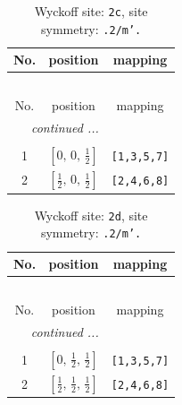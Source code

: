 \documentclass[fleqn,8pt]{jsarticle}
\begin{document}
\begin{longtable}{ccc}
\caption{Wyckoff site: {\tt 2c}, site symmetry: {\tt .2/m'.}}
 \\
 \hline \hline
No. & position & mapping \\ \hline \endfirsthead

\multicolumn{2}{l}{\tablename\ \thetable{}} \\
 \hline \hline
No. & position & mapping \\ \hline \endhead

 \hline \hline
\multicolumn{2}{r}{\footnotesize\it continued ...} \\ \endfoot

 \hline \hline
\multicolumn{2}{r}{} \\ \endlastfoot

1 & $\left[ 0,\, 0,\, \frac{1}{2} \right]$ & {\tt [1,3,5,7]} \\ \hline
2 & $\left[ \frac{1}{2},\, 0,\, \frac{1}{2} \right]$ & {\tt [2,4,6,8]} \\
\end{longtable}
\renewcommand{\arraystretch}{1.2}
\begin{longtable}{ccc}
\caption{Wyckoff site: {\tt 2d}, site symmetry: {\tt .2/m'.}}
 \\
 \hline \hline
No. & position & mapping \\ \hline \endfirsthead

\multicolumn{2}{l}{\tablename\ \thetable{}} \\
 \hline \hline
No. & position & mapping \\ \hline \endhead

 \hline \hline
\multicolumn{2}{r}{\footnotesize\it continued ...} \\ \endfoot

 \hline \hline
\multicolumn{2}{r}{} \\ \endlastfoot

1 & $\left[ 0,\, \frac{1}{2},\, \frac{1}{2} \right]$ & {\tt [1,3,5,7]} \\ \hline
2 & $\left[ \frac{1}{2},\, \frac{1}{2},\, \frac{1}{2} \right]$ & {\tt [2,4,6,8]} \\
\end{longtable}
\renewcommand{\arraystretch}{1.2}
\end{document}
